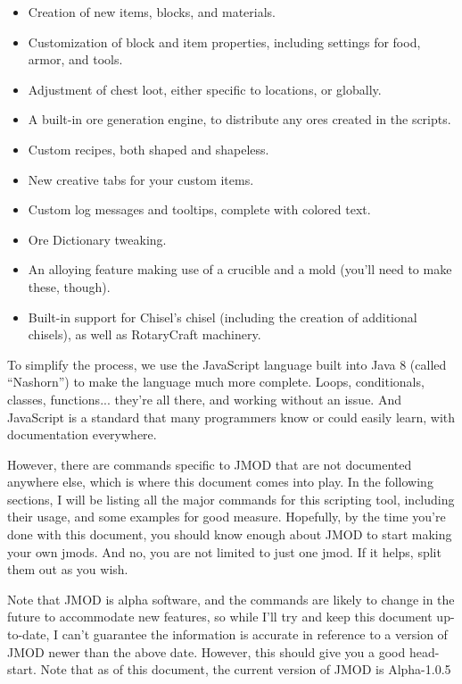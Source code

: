 \documentclass[letterpaper,titlepage,12pt]{article}
\begin{document}
\begin{itemize}
\item Creation of new items, blocks, and materials.
\item Customization of block and item properties, including settings for food, armor, and tools.
\item Adjustment of chest loot, either specific to locations, or globally.
\item A built-in ore generation engine, to distribute any ores created in the scripts.
\item Custom recipes, both shaped and shapeless.
\item New creative tabs for your custom items.
\item Custom log messages and tooltips, complete with colored text.
\item Ore Dictionary tweaking.
\item An alloying feature making use of a crucible and a mold (you'll need to make these, though).
\item Built-in support for Chisel's chisel (including the creation of additional chisels), as well as RotaryCraft machinery.
\end{itemize}

To simplify the process, we use the JavaScript language built into Java 8 (called ``Nashorn'') to make the language much more complete.  Loops, conditionals, classes, functions... they're all there, and working without an issue.  And JavaScript is a standard that many programmers know or could easily learn, with documentation everywhere.

However, there are commands specific to JMOD that are not documented anywhere else, which is where this document comes into play.  In the following sections, I will be listing all the major commands for this scripting tool, including their usage, and some examples for good measure.  Hopefully, by the time you're done with this document, you should know enough about JMOD to start making your own jmods.  And no, you are not limited to just one jmod.  If it helps, split them out as you wish.

Note that JMOD is alpha software, and the commands are likely to change in the future to accommodate new features, so while I'll try and keep this document up-to-date, I can't guarantee the information is accurate in reference to a version of JMOD newer than the above date.  However, this should give you a good head-start.  Note that as of this document, the current version of JMOD is Alpha-1.0.5
\end{document}
